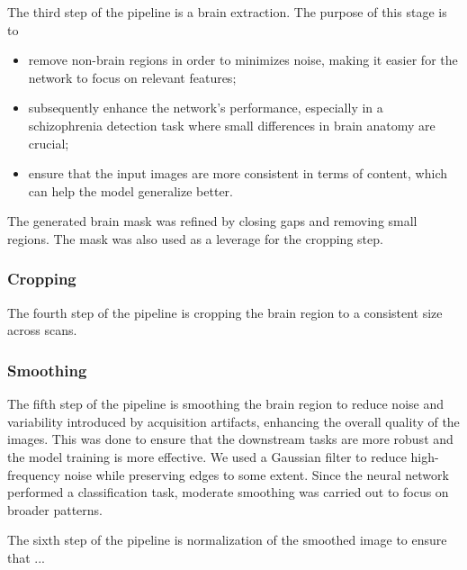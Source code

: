 The third step of the pipeline is a brain extraction. The purpose of this stage is to
\begin{itemize}
    \item remove non-brain regions in order to minimizes noise, making it easier for the network to focus on relevant features;
    \item subsequently enhance the network's performance, especially in a schizophrenia detection task where small differences in brain anatomy are crucial;
    \item ensure that the input images are more consistent in terms of content, which can help the model generalize better.
\end{itemize}

The generated brain mask was refined by closing gaps and removing small regions. The mask was also used as a leverage for the cropping step.



\subsubsection{Cropping}

The fourth step of the pipeline is cropping the brain region to a consistent size across scans.

\subsubsection{Smoothing}

The fifth step of the pipeline is smoothing the brain region to reduce noise and variability introduced by acquisition artifacts, enhancing the overall quality of the images. This was done to ensure that the downstream tasks are more robust and the model training is more effective. We used a Gaussian filter to reduce high-frequency noise while preserving edges to some extent. Since the neural network performed a classification task, moderate smoothing was carried out to focus on broader patterns.

The sixth step of the pipeline is normalization of the smoothed image to ensure that ...

